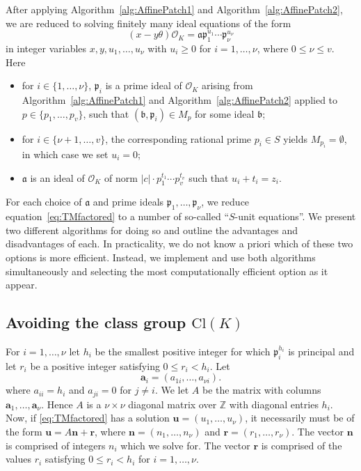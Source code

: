 \documentclass[11pt]{report}
\theoremstyle{definition}
\begin{document}
After applying Algorithm~\ref{alg:AffinePatch1} and Algorithm~\ref{alg:AffinePatch2}, we are reduced to solving finitely many ideal equations of the form
\begin{equation}\label{eq:TMfactored}
(x-y\theta)\mathcal{O}_K=\mathfrak{a} \mathfrak{p}_1^{u_1}\cdots \mathfrak{p}_{\nu}^{u_{\nu}}
\end{equation}
in integer variables $x,y,u_1, \dots, u_{\nu}$ with $u_i \geq 0$ for $i = 1, \dots, \nu$, where ${0 \leq \nu \leq v}$. Here
\begin{itemize}
\item for $i \in \{1, \dots, \nu\}$, $\mathfrak{p}_i$ is a prime ideal of $\mathcal{O}_K$ arising from Algorithm~\ref{alg:AffinePatch1} and Algorithm~\ref{alg:AffinePatch2} applied to $p \in \{p_1, \dots, p_v\}$, such that $(\mathfrak{b}, \mathfrak{p}_i) \in M_p$ for some ideal $\mathfrak{b}$;
\item for $i \in \{\nu+1, \dots, v\}$, the corresponding rational prime $p_i \in S$ yields $M_{p_i} = \emptyset$, in which case we set $u_i = 0$;
\item $\mathfrak{a}$ is an ideal of $\mathcal{O}_K$ of norm $|c|\cdot p_1^{t_1} \cdots p_v^{t_v}$ such that
$u_i + t_i =  z_i$.
\end{itemize}

For each choice of $\mathfrak{a}$ and prime ideals $\mathfrak{p}_1, \dots, \mathfrak{p}_{\nu}$, we reduce equation~\eqref{eq:TMfactored} to a number of so-called ``$S$-unit equations''. We present two different algorithms for doing so and outline the advantages and disadvantages of each. In practicality, we do not know a priori which of these two options is more efficient. Instead, we implement and use both algorithms simultaneously and selecting the most computationally efficient option as it appear.


\subsection{Avoiding the class group $\text{Cl}(K)$}
\label{subsec:FactorizationTMwithoutOK}

For $i = 1, \dots, {\nu}$ let $h_i$ be the smallest positive integer for which $\mathfrak{p}_i^{h_i}$ is principal and let
$r_i$ be a positive integer satisfying $0 \leq r_i < h_i$. Let
\[\mathbf{a}_i = (a_{1i}, \dots, a_{{\nu}i}).\]
where $a_{ii} = h_i$ and $a_{ji} = 0$ for $j \neq i$. We let $A$ be the matrix with columns $\mathbf{a}_1, \dots, \mathbf{a}_{\nu}$. Hence $A$ is a $\nu \times \nu$ diagonal matrix over $\mathbb{Z}$ with diagonal entries $h_i$. Now, if \eqref{eq:TMfactored} has a solution $\mathbf{u} = (u_1, \dots, u_{\nu})$, it necessarily must be of the form $\mathbf{u} = A\mathbf{n} + \mathbf{r}$, where $\mathbf{n} = (n_1, \dots, n_{\nu})$ and $\mathbf{r} = (r_1, \dots, r_{\nu})$. The vector $\mathbf{n}$ is comprised of integers $n_i$ which we solve for. The vector $\mathbf{r}$ is comprised of the values $r_i$ satisfying $0 \leq r_i < h_i$ for $i = 1, \dots, \nu$.
\end{document}
